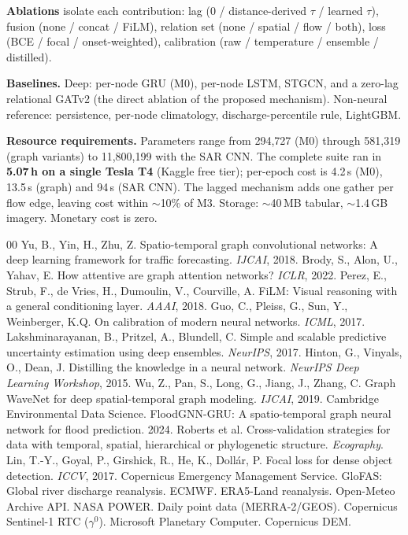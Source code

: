 \documentclass[sigconf]{acmart}
\begin{document}
\textbf{Ablations} isolate each contribution: lag ($0$ / distance-derived $\tau$ / learned $\tau$), fusion (none / concat / FiLM), relation set (none / spatial / flow / both), loss (BCE / focal / onset-weighted), calibration (raw / temperature / ensemble / distilled).

\textbf{Baselines.} Deep: per-node GRU (M0), per-node LSTM, STGCN, and a zero-lag relational GATv2 (the direct ablation of the proposed mechanism). Non-neural reference: persistence, per-node climatology, discharge-percentile rule, LightGBM.

\textbf{Resource requirements.} Parameters range from 294,727 (M0) through 581,319 (graph variants) to 11,800,199 with the SAR CNN. The complete suite ran in \textbf{5.07\,h on a single Tesla T4} (Kaggle free tier); per-epoch cost is 4.2\,s (M0), 13.5\,s (graph) and 94\,s (SAR CNN). The lagged mechanism adds one gather per flow edge, leaving cost within $\sim$10\% of M3. Storage: $\sim$40\,MB tabular, $\sim$1.4\,GB imagery. Monetary cost is zero.


\begin{thebibliography}{00}
 Yu, B., Yin, H., Zhu, Z. Spatio-temporal graph convolutional networks: A deep learning framework for traffic forecasting. \textit{IJCAI}, 2018.
 Brody, S., Alon, U., Yahav, E. How attentive are graph attention networks? \textit{ICLR}, 2022.
 Perez, E., Strub, F., de Vries, H., Dumoulin, V., Courville, A. FiLM: Visual reasoning with a general conditioning layer. \textit{AAAI}, 2018.
 Guo, C., Pleiss, G., Sun, Y., Weinberger, K.Q. On calibration of modern neural networks. \textit{ICML}, 2017.
 Lakshminarayanan, B., Pritzel, A., Blundell, C. Simple and scalable predictive uncertainty estimation using deep ensembles. \textit{NeurIPS}, 2017.
 Hinton, G., Vinyals, O., Dean, J. Distilling the knowledge in a neural network. \textit{NeurIPS Deep Learning Workshop}, 2015.
 Wu, Z., Pan, S., Long, G., Jiang, J., Zhang, C. Graph WaveNet for deep spatial-temporal graph modeling. \textit{IJCAI}, 2019.
 Cambridge Environmental Data Science. FloodGNN-GRU: A spatio-temporal graph neural network for flood prediction. 2024.
 Roberts et al. Cross-validation strategies for data with temporal, spatial, hierarchical or phylogenetic structure. \textit{Ecography}.
 Lin, T.-Y., Goyal, P., Girshick, R., He, K., Doll\'ar, P. Focal loss for dense object detection. \textit{ICCV}, 2017.
 Copernicus Emergency Management Service. GloFAS: Global river discharge reanalysis.
 ECMWF. ERA5-Land reanalysis. Open-Meteo Archive API.
 NASA POWER. Daily point data (MERRA-2/GEOS).
 Copernicus Sentinel-1 RTC ($\gamma^0$). Microsoft Planetary Computer.
 Copernicus DEM.
\end{thebibliography}
\end{document}
